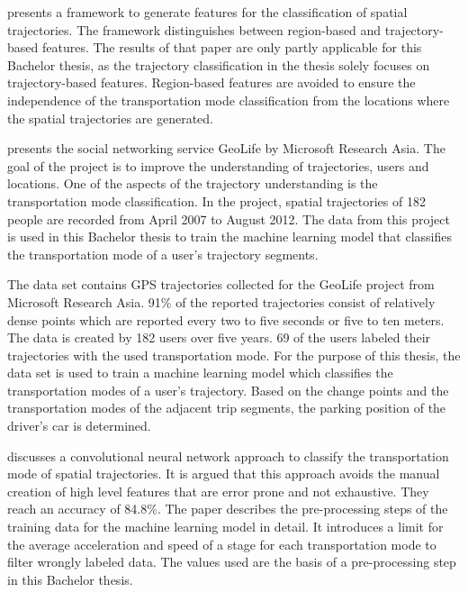 \cite{lee2008traclass} presents a framework to generate features for the classification of spatial trajectories. The framework distinguishes between region-based and trajectory-based features.  \newline
The results of that paper are only partly applicable for this Bachelor thesis, as the trajectory classification in the thesis solely focuses on trajectory-based features. Region-based features are avoided to ensure the independence of the transportation mode classification from the locations where the spatial trajectories are generated.

\cite{zheng2010geolife} presents the social networking service GeoLife by Microsoft Research Asia. The goal of the project is to improve the understanding of trajectories, users and locations. One of the aspects of the trajectory understanding is the transportation mode classification. In the project, spatial trajectories of 182 people are recorded from April 2007 to August 2012.\newline
The data from this project is used in this Bachelor thesis to train the machine learning model that classifies the transportation mode of a user's trajectory segments.

The data set \cite{zheng2008understanding}\cite{zheng2010geolife}\cite{geolife-dataset}\cite{zheng2009mining} contains GPS trajectories collected for the GeoLife project from Microsoft Research Asia. 91\% of the reported trajectories consist of relatively dense points which are reported every two to five seconds or five to ten meters. The data is created by 182 users over five years. 69 of the users labeled their trajectories with the used transportation mode. \newline
For the purpose of this thesis, the data set is used to train a machine learning model which classifies the transportation modes of a user's trajectory. Based on the change points and the transportation modes of the adjacent trip segments, the parking position of the driver's car is determined. 

\cite{Dabiri2018} discusses a convolutional neural network approach to classify the transportation mode of spatial trajectories. It is argued that this approach avoids the manual creation of high level features that are error prone and not exhaustive. They reach an accuracy of 84.8\%.\newline
The paper describes the pre-processing steps of the training data for the machine learning model in detail. It introduces a limit for the average acceleration and speed of a stage for each transportation mode to filter wrongly labeled data. The values used are the basis of a pre-processing step in this Bachelor thesis.